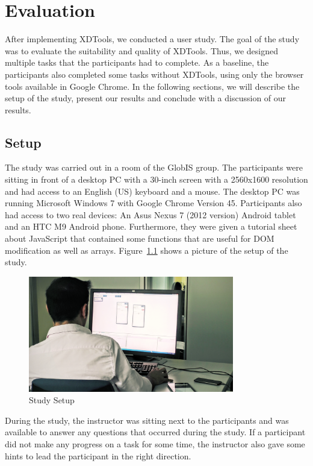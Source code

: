 \chapter{Evaluation}

After implementing XDTools, we conducted a user study. The goal of the study was to evaluate the suitability and quality of XDTools. Thus, we designed multiple tasks that the participants had to complete. As a baseline, the participants also completed some tasks without XDTools, using only the browser tools available in Google Chrome. In the following sections, we will describe the setup of the study, present our results and conclude with a discussion of our results.

\section{Setup}

The study was carried out in a room of the GlobIS group. The participants were sitting in front of a desktop PC with a 30-inch screen with a 2560x1600 resolution and had access to an English (US) keyboard and a mouse. The desktop PC was running Microsoft Windows 7 with Google Chrome Version 45. Participants also had access to two real devices: An Asus Nexus 7 (2012 version) Android tablet and an HTC M9 Android phone. Furthermore, they were given a tutorial sheet about JavaScript that contained some functions that are useful for DOM modification as well as arrays. Figure~\ref{fig:study_setup} shows a picture of the setup of the study.

\begin{figure}[H]
  \centering
    \includegraphics[width=0.8\textwidth]{images/study_setup2.png}
	\caption[Photo: Study setup]{Study Setup}
	\label{fig:study_setup}
\end{figure}

During the study, the instructor was sitting next to the participants and was available to answer any questions that occurred during the study. If a participant did not make any progress on a task for some time, the instructor also gave some hints to lead the participant in the right direction.

